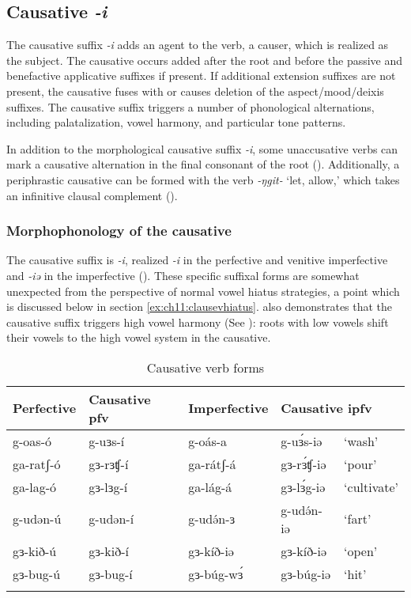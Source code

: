 \subsection{Causative \textit{-i}}\label{sec:ch11:causative}

The causative suffix \textit{-i} adds an agent to the verb, a causer, which is realized as the subject. The causative occurs added after the root and before the passive and benefactive applicative suffixes if present. If additional extension suffixes are not present, the causative fuses with or causes deletion of the aspect/mood/deixis suffixes. The causative suffix triggers a number of phonological alternations, including palatalization, vowel harmony, and particular tone patterns. 

In addition to the morphological causative suffix \textit{-i}, some unaccusative verbs can mark a causative alternation in the final consonant of the root (). Additionally, a periphrastic causative can be formed with the verb \textit{-ŋgit-} `let, allow,' which takes an infinitive clausal complement (). 

\subsubsection{Morphophonology of the causative}\label{sec:ch11:causpalatal}

The causative suffix is \textit{-i}, realized \textit{-i} in the perfective and venitive imperfective and \textit{-iə} in the imperfective (). These specific suffixal forms are somewhat unexpected from the perspective of normal vowel hiatus strategies, a point which is discussed below in section \ref{ex:ch11:clausevhiatus}.  also demonstrates that the causative suffix triggers high vowel harmony (See ): roots with low vowels shift their vowels to the high vowel system in the causative.

\begin{table}
\begin{tabular}[t]{lllll}
\lsptoprule
Perfective	& Causative pfv 	& Imperfective & \multicolumn{2}{l}{Causative ipfv} 	 \\
\midrule
g-oas-ó			& 	g-uɜs-í 		& g-oás-a		& 	g-uɜ́s-iə 	& 	‘wash’	\\
ga-ratʃ-ó		&	gɜ-rɜʧ-í 		& ga-rátʃ-á		&	gɜ-rɜ́ʧ-iə 	& 	‘pour’\\ 
ga-lag-ó		&	gɜ-lɜg-í 		& ga-lág-á		&	gɜ-lɜ́g-iə 	&	 ‘cultivate’\\ 
g-udən-ú		& 	g-udən-í 		&	g-udə́n-ɜ		&	g-udə́n-iə	& 	‘fart’\\
gɜ-kið-ú		&	gɜ-kið-í		&	gɜ-kíð-iə	&	gɜ-kíð-iə	&	‘open’\\
gɜ-bug-ú		&	gɜ-bug-í		&	gɜ-búg-wɜ́	&	gɜ-búg-iə	&	‘hit’\\
\lspbottomrule
\end{tabular}
\caption{Causative verb forms} \label{tab:ch11:caus}    
\end{table}  

